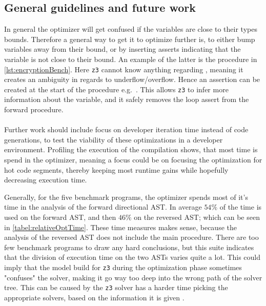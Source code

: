 \subsection{General guidelines and future work}
In general the \lan optimizer will get confused if the variables are close to their types bounds.
Therefore a general way to get it to optimize further is, to either bump variables away from their
bound, or by inserting asserts indicating that the variable is not close to their bound. An
example of the latter is the  procedure in \autoref{lst:encryptionBench}.
Here \texttt{z3} cannot know anything regarding , meaning it creates an
ambiguity in regards to underflow/overflow. Hence an assertion can be created at the start
of the procedure e.g.\ . This allows \texttt{z3}
to infer more information about the variable, and it safely removes the loop assert from the
forward procedure.
\\
\\
Further work should include focus on developer iteration time instead of code generations,
to test the viability of these optimizations in a developer environment. Profiling the execution
of the compilation shows, that most time is spend in the optimizer, meaning a focus could be
on focusing the optimization for hot code segments, thereby keeping most runtime gains while
hopefully decreasing execution time.

Generally, for the five benchmark programs, the optimizer spends most of it's time in the analysis
of the forward directional AST. In average $54\%$ of the time is used on the forward AST, and
then $46\%$ on the reversed AST; which can be seen in \autoref{tabel:relativeOptTime}.
These time measures makes sense, because the analysis of the reversed AST does not include the
main procedure. There are too few benchmark programs to draw any hard conclusions, but this suite
indicates that the division of execution time on the two ASTs varies quite a lot. This could
imply that the model build for \texttt{z3} during the optimization phase sometimes "confuses" the
solver, making it go way too deep into the wrong path of the solver tree. This can be caused by
the \texttt{z3} solver has a harder time picking the appropriate solvers, based on the
information it is given \cite{wrongSolver}.

